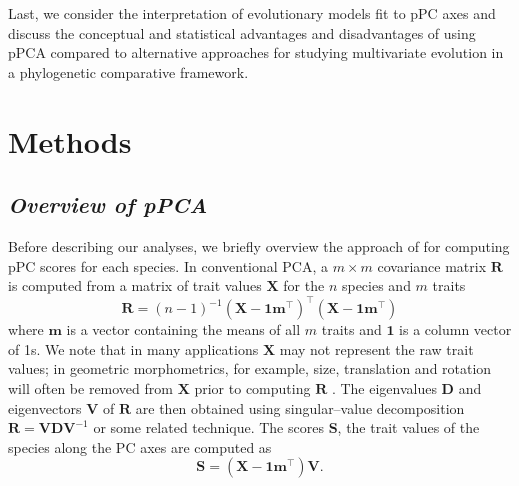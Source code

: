 \documentclass[a4paper,12pt]{article}
\begin{document}
Last, we consider the interpretation of evolutionary models fit to pPC axes and discuss the conceptual and statistical advantages and disadvantages of using pPCA compared to alternative approaches for studying multivariate evolution in a phylogenetic comparative framework.

\section{Methods}
\subsection{\emph{Overview of pPCA}}
Before describing our analyses, we briefly overview the approach of \citet{Revell2008} for computing pPC scores for each species. In conventional PCA, a $m \times m$ covariance matrix $\mathbf{R}$ is computed from a matrix of trait values $\mathbf{X}$ for the $n$ species and $m$ traits
\begin{equation}\label{eq:rpca}
\mathbf{R} = (n-1)^{-1}(\mathbf{X} - \mathbf{1m}^\intercal)^\intercal (\mathbf{X} - \mathbf{1m}^\intercal)
\end{equation}
where $\mathbf{m}$ is a vector containing the means of all $m$ traits and $\mathbf{1}$ is a column vector of 1s. We note that in many applications $\mathbf{X}$ may not represent the raw trait values; in geometric morphometrics, for example, size, translation and rotation will often be removed from $\mathbf{X}$ prior to computing $\mathbf{R}$ \citep{RohlfSlice, Bookstein1997}. The eigenvalues $\mathbf{D}$ and eigenvectors $\mathbf{V}$ of $\mathbf{R}$ are then obtained using singular--value decomposition $\mathbf{R}=\mathbf{V}\mathbf{D}\mathbf{V}^{-1}$ or some related technique. The scores $\mathbf{S}$, the trait values of the species along the PC axes are computed as
\begin{equation}\label{eq:Spca}
\mathbf{S}=(\mathbf{X} - \mathbf{1m}^\intercal)\mathbf{V}.
\end{equation}
\end{document}
